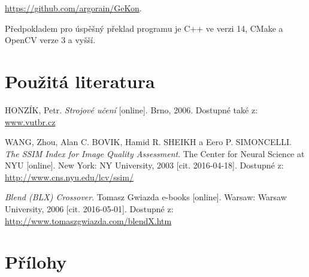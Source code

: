 \documentclass[a4paper,11pt,titlepage]{scrartcl}
\begin{document}
\url{https://github.com/argorain/GeKon}.

Předpokladem pro úspěšný překlad programu je C++ ve verzi 14, CMake a OpenCV verze 3 a vyšší.

\section{Použitá literatura}

\begin{thebibliography}{9}
 
HONZÍK, Petr. \emph{Strojové učení} [online]. Brno, 2006. Dostupné také z: \url{www.vutbr.cz}

WANG, Zhou, Alan C. BOVIK, Hamid R. SHEIKH a Eero P. SIMONCELLI. \emph{The SSIM Index for Image Quality Assessment}. The Center for Neural Science at NYU [online]. New York: NY University, 2003 [cit. 2016-04-18]. Dostupné z: \url{http://www.cns.nyu.edu/lcv/ssim/}

\emph{Blend (BLX) Crossover}. Tomasz Gwiazda e-books [online]. Warsaw: Warsaw University, 2006 [cit. 2016-05-01]. Dostupné z: \url{http://www.tomaszgwiazda.com/blendX.htm}

\end{thebibliography}

\newpage
\section{Přílohy}
\end{document}
